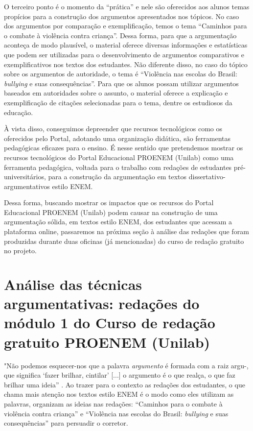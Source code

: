 \documentclass{textolivre}
\begin{document}
O terceiro ponto é o momento da “prática” e nele são oferecidos aos alunos temas propícios para a construção dos argumentos apresentados nos tópicos. No caso dos argumentos por comparação e exemplificação, temos o tema “Caminhos para o combate à violência contra criança”. Dessa forma, para que a argumentação aconteça de modo plausível, o material oferece diversas informações e estatísticas que podem ser utilizadas para o desenvolvimento de argumentos comparativos e exemplificativos nos textos dos estudantes. Não diferente disso, no caso do tópico sobre os argumentos de autoridade, o tema é “Violência nas escolas do Brasil: \emph{bullying} e suas consequências”. Para que os alunos possam utilizar argumentos baseados em autoridades sobre o assunto, o material oferece a explicação e exemplificação de citações selecionadas para o tema, dentre os estudiosos da educação.

À vista disso, conseguimos depreender que recursos tecnológicos como os oferecidos pelo Portal, adotando uma organização didática, são ferramentas pedagógicas eficazes para o ensino. É nesse sentido que pretendemos mostrar os recursos tecnológicos do Portal Educacional PROENEM (Unilab) como uma ferramenta pedagógica, voltada para o trabalho com redações de estudantes pré-universitários, para a construção da argumentação em textos dissertativo-argumentativos estilo ENEM. 

Dessa forma, buscando mostrar os impactos que os recursos do Portal Educacional PROENEM (Unilab) podem causar na construção de uma argumentação sólida, em textos estilo ENEM, dos estudantes que acessam a plataforma online, passaremos na próxima seção à análise das redações que foram produzidas durante duas oficinas (já mencionadas) do curso de redação gratuito no projeto. 

\section{Análise das técnicas argumentativas: redações do módulo 1 do Curso de redação gratuito PROENEM (Unilab)}
"Não podemos esquecer-nos que a palavra \emph{argumento} é formada com a raiz argu-, que significa ‘fazer brilhar, cintilar’ [...] o argumento é o que realça, o que faz brilhar uma ideia” \cite[p. 22]{fiorin2018}. Ao trazer para o contexto as redações dos estudantes, o que chama mais atenção nos textos estilo ENEM é o modo como eles utilizam as palavras, organizam as ideias nas redações: “Caminhos para o combate à violência contra criança” e “Violência nas escolas do Brasil: \emph{bullying} e suas consequências” para persuadir o corretor. 
\end{document}
